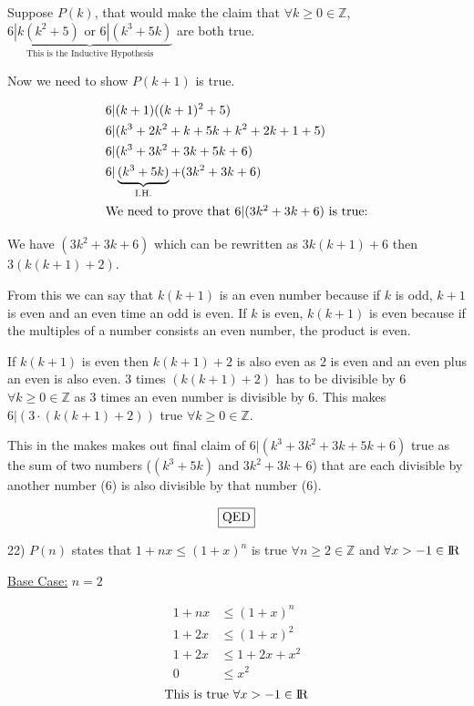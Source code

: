 \documentclass[11pt]{article}
\newcommand\tab[1][.8 cm]{\hspace*{#1}}
\newcommand*{\mybox}[1]{\framebox{#1}}
\begin{document}
\begin{flushleft}
Suppose $P(k)$, that would make the claim that $\forall k\geq 0 \in \mathbb{Z}$, $\underbrace{6|k(k^2+5) \text{ or }6|(k^3+5k)}\limits_{\text{This is the Inductive Hypothesis}}$ are both true.

Now we need to show $P(k+1)$ is true.

\begin{align*}
6 &| (k+1)((k+1)^2+5) \\
6 &| (k^3 + 2k^2 + k + 5k + k^2 + 2k + 1 + 5) \\
6 &| (k^3 + 3k^2 + 3k + 5k + 6) \\
6 &| \underbrace{(k^3 + 5k)}\limits_{\text{I.H.}} + (3k^2 + 3k + 6) \\
\intertext{We need to prove that $6|(3k^2+3k+6)$ is true:}
\end{align*}

We have $(3k^2+3k+6)$ which can be rewritten as $3k(k+1)+6$ then $3(k(k+1)+2)$.

\tab From this we can say that $k(k+1)$ is an even number because if $k$ is odd, $k+1$ is even and an even time an odd is even. If $k$ is even, $k(k+1)$ is even because if the multiples of a number consists an even number, the product is even.

\tab If $k(k+1)$ is even then $k(k+1)+2$ is also even as $2$ is even and an even plus an even is also even. $3$ times $(k(k+1)+2)$ has to be divisible by $6$ $\forall k\geq 0 \in \mathbb{Z}$ as 3 times an even number is divisible by 6. This makes $6| (3\cdot (k(k+1)+2))$ true $\forall k\geq 0 \in \mathbb{Z}$. 

This in the makes makes out final claim of $6 | (k^3 + 3k^2 + 3k + 5k + 6) $ true as the sum of two numbers ($(k^3+5k)$ and $3k^2+3k+6$) that are each divisible by another number ($6$) is also divisible by that number ($6$).

$$\text{\mybox{QED}}$$

\hrulefill

22) $P(n)$ states that $1+nx \leq (1+x)^n$ is true $\forall n\geq 2 \in \mathbb{Z}$ and $\forall x>-1 \in {\rm I\!R}$

\underline{Base Case:} $n=2$ 

\begin{align*}
1+nx &\leq (1+x)^n \\
1+2x &\leq (1+x)^2 \\
1+2x &\leq 1+2x+x^2 \\
0 &\leq x^2
\end{align*}
$$\text{This is true $\forall x > -1 \in {\rm I\!R}$}$$


\end{flushleft}
\end{document}
